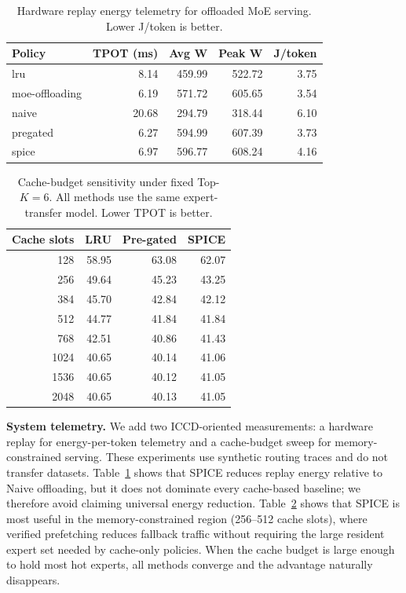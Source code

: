 
\begin{table}[t]
\centering
\caption{Hardware replay energy telemetry for offloaded MoE serving. Lower J/token is better.}
\label{tab:energy_replay}
\scriptsize
\begin{tabular}{lrrrr}
\toprule
Policy & TPOT (ms) & Avg W & Peak W & J/token \\
\midrule
lru & 8.14 & 459.99 & 522.72 & 3.75 \\
moe-offloading & 6.19 & 571.72 & 605.65 & 3.54 \\
naive & 20.68 & 294.79 & 318.44 & 6.10 \\
pregated & 6.27 & 594.99 & 607.39 & 3.73 \\
spice & 6.97 & 596.77 & 608.24 & 4.16 \\
\bottomrule
\end{tabular}
\end{table}

\begin{table}[t]
\centering
\caption{Cache-budget sensitivity under fixed Top-$K{=}6$. All methods use the same expert-transfer model. Lower TPOT is better.}
\label{tab:cache_budget}
\scriptsize
\begin{tabular}{rrrr}
\toprule
Cache slots & LRU & Pre-gated & SPICE \\
\midrule
128 & 58.95 & 63.08 & 62.07 \\
256 & 49.64 & 45.23 & 43.25 \\
384 & 45.70 & 42.84 & 42.12 \\
512 & 44.77 & 41.84 & 41.84 \\
768 & 42.51 & 40.86 & 41.43 \\
1024 & 40.65 & 40.14 & 41.06 \\
1536 & 40.65 & 40.12 & 41.05 \\
2048 & 40.65 & 40.13 & 41.05 \\
\bottomrule
\end{tabular}
\end{table}

\textbf{System telemetry.} We add two ICCD-oriented measurements: a hardware replay for energy-per-token telemetry and a cache-budget sweep for memory-constrained serving. These experiments use synthetic routing traces and do not transfer datasets. Table~\ref{tab:energy_replay} shows that SPICE reduces replay energy relative to Naive offloading, but it does not dominate every cache-based baseline; we therefore avoid claiming universal energy reduction. Table~\ref{tab:cache_budget} shows that SPICE is most useful in the memory-constrained region (256--512 cache slots), where verified prefetching reduces fallback traffic without requiring the large resident expert set needed by cache-only policies. When the cache budget is large enough to hold most hot experts, all methods converge and the advantage naturally disappears.
